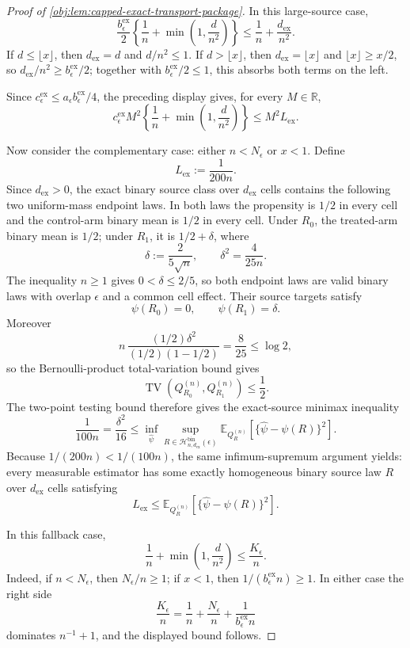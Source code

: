 \documentclass[11pt]{article}
\begin{document}
\begin{proof}[Proof of \cref{obj:lem:capped-exact-transport-package}]
In this large-source case,
\[
\frac{b_{\epsilon}^{\mathrm{ex}}}{2}
\left\{\frac1n+\min\left(1,\frac d{n^2}\right)\right\}
\le
\frac1n+\frac{d_{\mathrm{ex}}}{n^2}.
\]
If \(d\le\lfloor x\rfloor\), then \(d_{\mathrm{ex}}=d\) and \(d/n^2\le1\).  If \(d>\lfloor x\rfloor\), then \(d_{\mathrm{ex}}=\lfloor x\rfloor\) and \(\lfloor x\rfloor\ge x/2\), so \(d_{\mathrm{ex}}/n^2\ge b_{\epsilon}^{\mathrm{ex}}/2\); together with \(b_{\epsilon}^{\mathrm{ex}}/2\le1\), this absorbs both terms on the left. %

Since \(c_{\epsilon}^{\mathrm{ex}}\le a_\epsilon b_{\epsilon}^{\mathrm{ex}}/4\), the preceding display gives, for every \(M\in\mathbb R\),
\[
c_{\epsilon}^{\mathrm{ex}}M^2
\left\{\frac1n+\min\left(1,\frac d{n^2}\right)\right\}
\le
M^2L_{\mathrm{ex}} .
\]

Now consider the complementary case: either \(n<N_\epsilon\) or \(x<1\).  Define
\[
L_{\mathrm{ex}}:=\frac1{200n}.
\]
Since \(d_{\mathrm{ex}}>0\), the exact binary source class over \(d_{\mathrm{ex}}\) cells contains the following two uniform-mass endpoint laws.  In both laws the propensity is \(1/2\) in every cell and the control-arm binary mean is \(1/2\) in every cell.  Under \(R_0\), the treated-arm binary mean is \(1/2\); under \(R_1\), it is \(1/2+\delta\), where
\[
\delta:=\frac{2}{5\sqrt n},
\qquad
\delta^2=\frac{4}{25n}.
\]
The inequality \(n\ge1\) gives \(0<\delta\le2/5\), so both endpoint laws are valid binary laws with overlap \(\epsilon\) and a common cell effect.  Their source targets satisfy
\[
\psi(R_0)=0,
\qquad
\psi(R_1)=\delta .
\]
Moreover
\[
n\,\frac{(1/2)\delta^2}{(1/2)(1-1/2)}
=
\frac{8}{25}
\le \log 2,
\]
so the Bernoulli-product total-variation bound gives
\[
\operatorname{TV}\!\left(Q_{R_0}^{(n)},Q_{R_1}^{(n)}\right)\le\frac12 .
\]
The two-point testing bound therefore gives the exact-source minimax inequality
\[
\frac1{100n}
=
\frac{\delta^2}{16}
\le
\inf_{\widehat\psi}
\sup_{R\in\mathcal H_{n,d_{\mathrm{ex}}}^{\mathrm{bin}}(\epsilon)}
\mathbb E_{Q_R^{(n)}}\!\left[
\{\widehat\psi-\psi(R)\}^2
\right].
\]
Because \(1/(200n)<1/(100n)\), the same infimum-supremum argument yields: every measurable estimator has some exactly homogeneous binary source law \(R\) over \(d_{\mathrm{ex}}\) cells satisfying
\[
L_{\mathrm{ex}}
\le
\mathbb E_{Q_R^{(n)}}\!\left[
\{\widehat\psi-\psi(R)\}^2
\right].
\]

In this fallback case,
\[
\frac1n+\min\left(1,\frac d{n^2}\right)
\le
\frac{K_\epsilon}{n}.
\]
Indeed, if \(n<N_\epsilon\), then \(N_\epsilon/n\ge1\); if \(x<1\), then \(1/(b_{\epsilon}^{\mathrm{ex}}n)\ge1\).  In either case the right side
\[
\frac{K_\epsilon}{n}
=
\frac1n+\frac{N_\epsilon}{n}
+\frac1{b_{\epsilon}^{\mathrm{ex}}n}
\]
dominates \(n^{-1}+1\), and the displayed bound follows. %


\end{proof}
\end{document}
